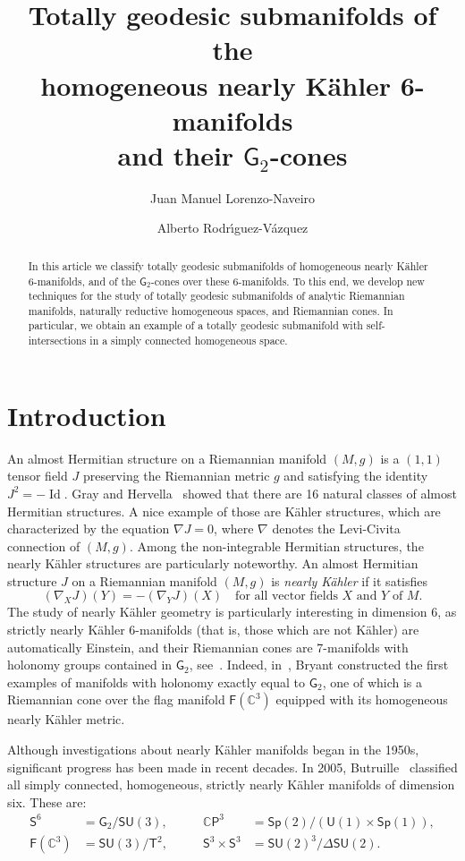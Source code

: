 \documentclass[11pt,a4paper,final]{amsart}
\title[Totally geodesic submanifolds of the homogeneous nearly Kähler 6-manifolds]{Totally geodesic submanifolds of the\\ homogeneous nearly Kähler 6-manifolds\\ and their $\mathsf{G}_2$-cones}
\author[J.~M. Lorenzo-Naveiro]{Juan Manuel Lorenzo-Naveiro}
\author[A. Rodr\'{\i}guez-V\'{a}zquez]{Alberto Rodr\'{\i}guez-V\'{a}zquez}
\newcommand{\s}{\mathsf}
\newcommand{\C}{\mathbb{C}}
\theoremstyle{definition}
\begin{document}
	\begin{abstract}
	In this article we classify totally geodesic submanifolds of homogeneous nearly Kähler $6$-manifolds, and of the $\mathsf{G}_2$-cones over these $6$-manifolds. To this end, we develop new techniques for the study of totally geodesic submanifolds of analytic Riemannian manifolds, naturally reductive homogeneous spaces, and  Riemannian cones.
	In particular, we obtain an example of a totally geodesic submanifold with self-intersections in a simply connected homogeneous space.
	\end{abstract}
\maketitle


\section{Introduction}

An almost Hermitian structure on a Riemannian manifold $(M,g)$ is a $(1,1)$ tensor field $J$ preserving the Riemannian metric $g$ and satisfying the identity $J^2=-\operatorname{Id}$. Gray and Hervella~\cite{grayhervella} showed that there are 16 natural classes of almost Hermitian structures.
A nice example of those are Kähler structures, which are characterized by the equation $\nabla J=0$, where $\nabla$ denotes the Levi-Civita connection of $(M,g)$. Among the non-integrable Hermitian structures, the nearly Kähler structures are particularly noteworthy.
An almost Hermitian structure $J$ on a Riemannian manifold $(M,g)$ is \textit{nearly K\"ahler} if it satisfies
\[ (\nabla_X J)(Y) =-(\nabla_Y J)(X) \quad \textrm{for all vector fields $X$ and $Y$ of $M$}. \]
The study of nearly Kähler geometry is particularly interesting in dimension $6$, as strictly nearly Kähler $6$-manifolds (that is, those which are not Kähler) are automatically Einstein, and their Riemannian cones are 7-manifolds with holonomy groups contained in $\s{G}_2$, see~\cite{bar}.   Indeed, in~\cite{bryant}, Bryant constructed the first examples of manifolds with holonomy exactly equal to $\s{G}_2$, one of which is a Riemannian cone over the flag manifold $\s{F}(\C^3)$
equipped with its homogeneous nearly Kähler metric.

Although investigations about nearly Kähler manifolds began in the 1950s, significant progress has been made in recent decades.
In 2005, Butruille~\cite{Butruille} classified all simply connected, homogeneous, strictly nearly Kähler manifolds of dimension six. These are:
\[
\begin{aligned}
\mathsf{S}^6&=\s{G}_2/\s{SU}(3),  &\qquad \C\s{P}^3&=\s{Sp}(2)/(\s{U}(1)\times\s{Sp}(1)), \\ \mathsf{F}(\C^3)&=\s{SU}(3)/\s{T}^2, &\qquad \s{S}^3\times\s{S}^3&=\s{SU}(2)^3/\Delta \s{SU}(2).
\end{aligned}
\]
\end{document}
